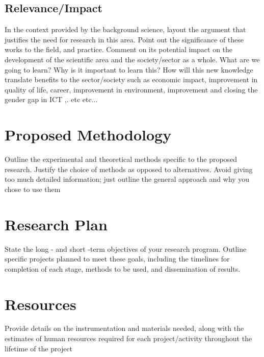 \documentclass{article}
\begin{document}
\subsection{Relevance/Impact}

In the context provided by the background science, layout the argument that justifies the need for research in this area. Point out the significance of these works to the field, and practice. Comment on its potential impact on the development of the scientific area and the society/sector as a whole. What are we going to learn? Why is it important to learn this? How will this new knowledge translate benefits to the sector/society such as economic impact, improvement in quality of life, career, improvement in environment, improvement and closing the gender gap in ICT ,. etc etc...

\section{Proposed Methodology}
Outline the experimental and theoretical methods specific to the proposed research. Justify the choice of methods as opposed to alternatives. Avoid giving too much detailed information; just outline the general approach and why you chose to use them

\section{Research Plan}
State the long - and short -term objectives of your research program. Outline specific projects planned to meet these goals, including the timelines for completion of each stage, methods to be used, and dissemination of results. 

\section{Resources}
Provide details on the instrumentation and materials needed, along with the estimates of human resources required for each project/activity throughout the lifetime of the project
\end{document}
